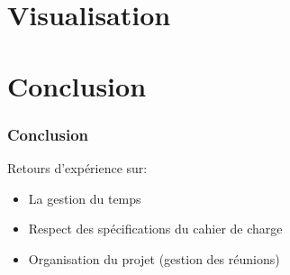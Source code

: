 \documentclass[10pt, compress]{beamer}
\begin{document}
\section{Visualisation}

\section*{Conclusion}
\begin{frame}[fragile]
	\frametitle{Conclusion}
Retours d'expérience sur:
\begin{itemize}[<+->]
	[square]
\item{La gestion du temps}
\item{Respect des spécifications du cahier de charge}
\item{Organisation du projet (gestion des réunions)}
\end{itemize}
\end{frame}
\end{document}
